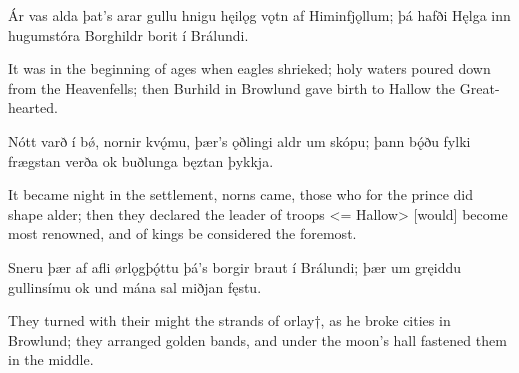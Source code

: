 \bookStart

Ár vas alda \hld þat’s arar gullu
hnigu hęilǫg vǫtn \hld af Himinfjǫllum;
þá hafði Hęlga \hld inn hugumstóra
Borghildr borit \hld í Brálundi.

It was in the beginning of ages when eagles shrieked; holy waters poured down from the Heavenfells; then Burhild in Browlund gave birth to Hallow the Great-hearted.

Nótt varð í bǿ, \hld nornir kvǫ́mu,
þær’s ǫðlingi \hld aldr um skópu;
þann bǫ́ðu fylki \hld frægstan verða
ok buðlunga \hld bęztan þykkja.

It became night in the settlement, norns came, those who for the prince did shape alder; then they declared the leader of troops <= Hallow> [would] become most renowned, and of kings be considered the foremost.

Sneru þær af afli \hld ørlǫgþǫ́ttu
þá’s borgir braut \hld í Brálundi;
þær um gręiddu \hld gullinsímu
ok und mána sal \hld miðjan fęstu.

They turned with their might the strands of orlay†, as he broke cities in Browlund; they arranged golden bands, and under the moon's hall fastened them in the middle. 
